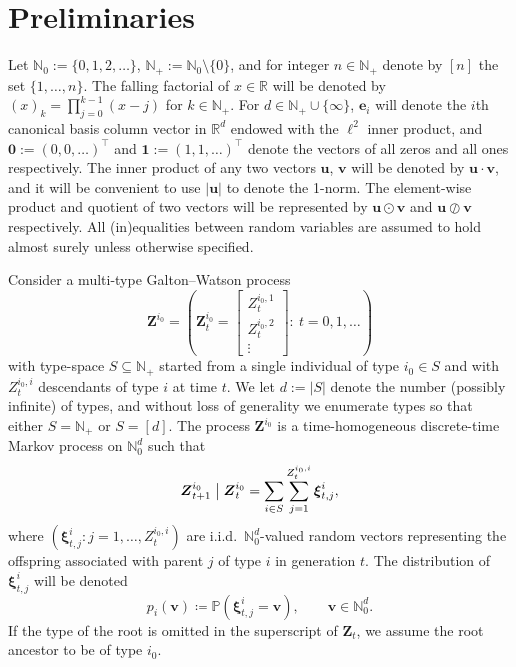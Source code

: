 \documentclass[preprint,3p,12pt]{elsarticle}
\theoremstyle{definition}
\begin{document}
\section{Preliminaries}\label{prelim}

Let $\mathbb{N}_0 := \{0, 1, 2,\dots\}$, $\mathbb{N}_+ := \mathbb{N}_0 \setminus \{0\}$, and for integer $n \in \mathbb{N}_+$ denote by $[n]$ the set $\{1,\dots,n\}$. The falling factorial of $x \in \mathbb{R}$ will be denoted by $(x)_k = \prod_{j=0}^{k-1} (x - j)$ for $k \in \mathbb{N}_+$. For $d \in \mathbb{N}_+ \cup \{\infty\}$, $\boldsymbol{e}_i$ will denote the $i$th canonical basis column vector in $\mathbb{R}^d$ endowed with the $\ell^2$ inner product, and $\boldsymbol{0} := (0,0,\dots)^\top$ and $\boldsymbol{1} := (1,1,\dots)^\top$ denote the vectors of all zeros and all ones respectively. The inner product of any two vectors $\boldsymbol{u}$, $\boldsymbol{v}$ will be denoted by $\boldsymbol{u} \cdot \boldsymbol{v}$, and it will be convenient to use $\vert \boldsymbol{u} \vert$ to denote the 1-norm. The element-wise product and quotient of two vectors will be represented by $\boldsymbol{u}\odot\boldsymbol{v}$ and $\boldsymbol{u}\oslash\boldsymbol{v}$ respectively. All (in)equalities between random variables are assumed to hold almost surely unless otherwise specified.

Consider a multi-type Galton--Watson process
\begin{equation*}
    \boldsymbol{Z}^{i_0} = \left(\boldsymbol{Z}_t^{i_0} = \begin{bmatrix}
        Z_t^{i_0, 1} \\
        Z_t^{i_0, 2}\\ 
        \vdots 
    \end{bmatrix} :\: t=0,1,\dots\right)
\end{equation*}
with type-space $S \subseteq\mathbb{N}_+$ started from a single individual of type $i_0\in S$ and with $Z_t^{i_0,i}$ descendants of type $i$ at time $t$. We let $d := |S|$ denote the number (possibly infinite) of types, and without loss of generality we enumerate types so that either $S=\mathbb{N}_+$ or $S=[d]$. The process $\boldsymbol{Z}^{i_0}$ is a time-homogeneous discrete-time Markov process on $\mathbb{N}_0^{d}$ such that 
\[
\boldsymbol{Z}_{t+1}^{i_0}\bigm| \boldsymbol{Z}_{t}^{i_0} = \sum_{i \in S} \sum_{j=1}^{Z_{t}^{i_0, i}} \boldsymbol{\xi}^i_{t,j},
\]
where $(\boldsymbol{\xi}^i_{t,j}: j=1,\dots,Z_{t}^{i_0,i})$ are i.i.d.\ $\mathbb{N}_0^{d}$-valued random vectors representing the offspring associated with parent $j$ of type $i$ in generation $t$. The distribution of $ \boldsymbol{\xi}^i_{t,j}$ will be denoted
\[
p_i(\boldsymbol{v}) \coloneq \mathbb{P}(\boldsymbol{\xi}^i_{t,j} = \boldsymbol{v}), \qquad \boldsymbol{v} \in \mathbb{N}_0^d.
\]
If the type of the root is omitted in the superscript of $\boldsymbol{Z}_t$, we assume the root ancestor to be of type $i_0$.
\end{document}
